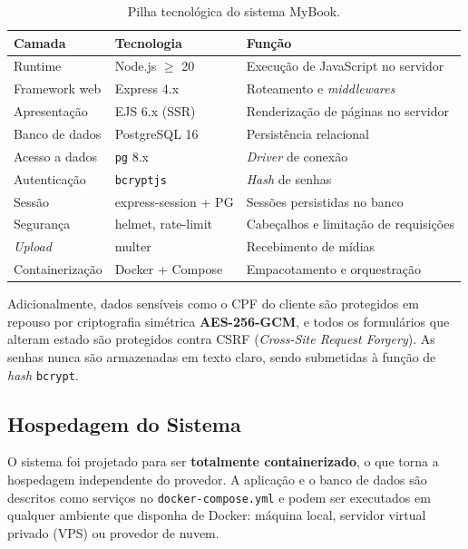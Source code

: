 \documentclass[a4paper,12pt]{article}
\begin{document}
\begin{table}[H]
    \centering
    \caption{Pilha tecnológica do sistema MyBook.}
    \label{tab:stack}
    \begin{tabular}{lll}
        \toprule
        \textbf{Camada} & \textbf{Tecnologia} & \textbf{Função} \\
        \midrule
        Runtime          & Node.js $\geq$ 20      & Execução de JavaScript no servidor \\
        Framework web    & Express 4.x            & Roteamento e \emph{middlewares} \\
        Apresentação     & EJS 6.x (SSR)          & Renderização de páginas no servidor \\
        Banco de dados   & PostgreSQL 16          & Persistência relacional \\
        Acesso a dados   & \texttt{pg} 8.x        & \emph{Driver} de conexão \\
        Autenticação     & \texttt{bcryptjs}      & \emph{Hash} de senhas \\
        Sessão           & express-session + PG   & Sessões persistidas no banco \\
        Segurança        & helmet, rate-limit     & Cabeçalhos e limitação de requisições \\
        \emph{Upload}    & multer                 & Recebimento de mídias \\
        Containerização  & Docker + Compose       & Empacotamento e orquestração \\
        \bottomrule
    \end{tabular}
\end{table}

Adicionalmente, dados sensíveis como o CPF do cliente são protegidos em repouso por
criptografia simétrica \textbf{AES-256-GCM}, e todos os formulários que alteram estado
são protegidos contra CSRF (\emph{Cross-Site Request Forgery}). As senhas nunca são
armazenadas em texto claro, sendo submetidas à função de \emph{hash} \texttt{bcrypt}.

\subsection{Hospedagem do Sistema}

O sistema foi projetado para ser \textbf{totalmente containerizado}, o que torna a
hospedagem independente do provedor. A aplicação e o banco de dados são descritos como
serviços no \texttt{docker-compose.yml} e podem ser executados em qualquer ambiente que
disponha de Docker: máquina local, servidor virtual privado (VPS) ou provedor de nuvem.
\end{document}
